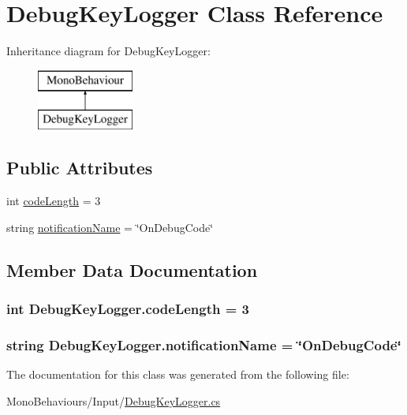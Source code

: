 \hypertarget{class_debug_key_logger}{}\section{Debug\+Key\+Logger Class Reference}
\label{class_debug_key_logger}
Inheritance diagram for Debug\+Key\+Logger\+:\begin{figure}[H]
\begin{center}
\leavevmode
\includegraphics[height=2.000000cm]{class_debug_key_logger}
\end{center}
\end{figure}
\subsection*{Public Attributes}
\begin{DoxyCompactItemize}
\item 
int \hyperlink{class_debug_key_logger_a1e1bf5854d7d77b8cb6dda20ecabba80}{code\+Length} = 3
\item 
string \hyperlink{class_debug_key_logger_a7374e9edbf27d3101d12370f633c3136}{notification\+Name} = \char`\"{}On\+Debug\+Code\char`\"{}
\end{DoxyCompactItemize}


\subsection{Member Data Documentation}
\subsubsection[{\texorpdfstring{code\+Length}{codeLength}}]{\setlength{\rightskip}{0pt plus 5cm}int Debug\+Key\+Logger.\+code\+Length = 3}\hypertarget{class_debug_key_logger_a1e1bf5854d7d77b8cb6dda20ecabba80}{}\label{class_debug_key_logger_a1e1bf5854d7d77b8cb6dda20ecabba80}
\subsubsection[{\texorpdfstring{notification\+Name}{notificationName}}]{\setlength{\rightskip}{0pt plus 5cm}string Debug\+Key\+Logger.\+notification\+Name = \char`\"{}On\+Debug\+Code\char`\"{}}\hypertarget{class_debug_key_logger_a7374e9edbf27d3101d12370f633c3136}{}\label{class_debug_key_logger_a7374e9edbf27d3101d12370f633c3136}


The documentation for this class was generated from the following file\+:\begin{DoxyCompactItemize}
\item 
Mono\+Behaviours/\+Input/\hyperlink{_debug_key_logger_8cs}{Debug\+Key\+Logger.\+cs}\end{DoxyCompactItemize}
